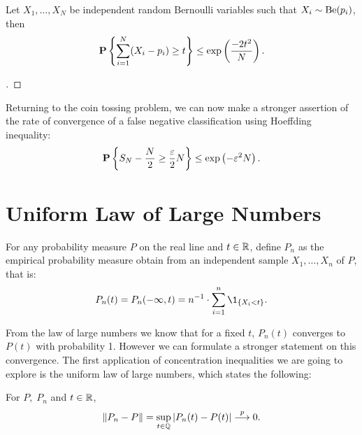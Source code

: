 \begin{corollary}\label{hoeffding:bernoulli}
  Let $X_1,\ldots, X_N$ be independent random Bernoulli variables such that $X_i \sim \Be(p_i)$, then
  \[ \P\left\{ \sum_{i = 1}^N (X_i - p_i) \geq t\right\} \leq \exp\left( \frac{-2t^2}{N}\right). \] 
\end{corollary}

\begin{proof}[]

\end{proof}

Returning to the coin tossing problem, we can now make a stronger assertion of the rate of convergence of a false negative classification using Hoeffding inequality:
\[\P \left\{S_N- \frac{N}{2} \geq \frac{\varepsilon}{2} N \right\} \leq \exp\left( - \varepsilon^2 N \right). \] 




\section{Uniform Law of Large Numbers}

For any probability measure $P$ on the real line and $t \in \R$, define $P_n$ as the empirical probability measure obtain from an independent sample $X_1, \ldots, X_n$ of $P$, that is:
\[ P_n(t) = P_n(-\infty, t) = n^{-1} \cdot \sum_{i = 1}^n \1_{\{ X_i < t\}}.\]

From the law of large numbers we know that for a fixed $t$, $P_n(t)$ converges to $P(t)$ with probability 1. However we can formulate a stronger statement on this convergence. The first application of concentration inequalities we are going to explore is the uniform law of large numbers, which states the following:

\begin{theorem}\label{glivenko-cantelli}
  For $P,\; P_n$ and $t \in \R$,
  \[ \|P_n - P\| = \sup_{t\in \Q} \left|P_n(t) - P(t)\right| \overset{p}{\longrightarrow} 0.\]  
\end{theorem} 


